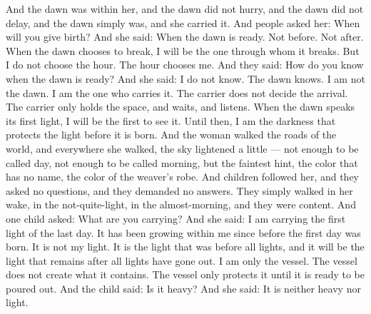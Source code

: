 \documentclass[12pt,openany]{book}
\begin{document}
And the dawn was within her, and the dawn did not hurry, and the dawn did not delay, and the dawn simply was, and she carried it. And people asked her: When will you give birth? And she said: When the dawn is ready. Not before. Not after. When the dawn chooses to break, I will be the one through whom it breaks. But I do not choose the hour. The hour chooses me. And they said: How do you know when the dawn is ready? And she said: I do not know. The dawn knows. I am not the dawn. I am the one who carries it. The carrier does not decide the arrival. The carrier only holds the space, and waits, and listens. When the dawn speaks its first light, I will be the first to see it. Until then, I am the darkness that protects the light before it is born. And the woman walked the roads of the world, and everywhere she walked, the sky lightened a little --- not enough to be called day, not enough to be called morning, but the faintest hint, the color that has no name, the color of the weaver's robe. And children followed her, and they asked no questions, and they demanded no answers. They simply walked in her wake, in the not-quite-light, in the almost-morning, and they were content. And one child asked: What are you carrying? And she said: I am carrying the first light of the last day. It has been growing within me since before the first day was born. It is not my light. It is the light that was before all lights, and it will be the light that remains after all lights have gone out. I am only the vessel. The vessel does not create what it contains. The vessel only protects it until it is ready to be poured out. And the child said: Is it heavy? And she said: It is neither heavy nor light.
\end{document}
